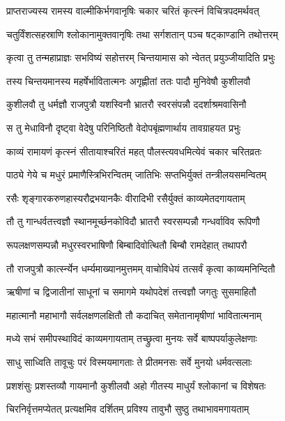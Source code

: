 
\twolineshloka
{प्राप्तराज्यस्य रामस्य वाल्मीकिर्भगवानृषिः}
{चकार चरितं कृत्स्नं विचित्रपदमर्थवत्} %

\twolineshloka
{चतुर्विंशत्सहस्राणि श्लोकानामुक्तवानृषिः}
{तथा सर्गशतान् पञ्च षट्काण्डानि तथोत्तरम्} %

\twolineshloka
{कृत्वा तु तन्महाप्राज्ञः सभविष्यं सहोत्तरम्}
{चिन्तयामास को न्वेतत् प्रयुञ्जीयादिति प्रभुः} %

\twolineshloka
{तस्य चिन्तयमानस्य महर्षेर्भावितात्मनः}
{अगृह्णीतां ततः पादौ मुनिवेषौ कुशीलवौ} %

\twolineshloka
{कुशीलवौ तु धर्मज्ञौ राजपुत्रौ यशस्विनौ}
{भ्रातरौ स्वरसंपन्नौ ददर्शाश्रमवासिनौ} %

\twolineshloka
{स तु मेधाविनौ दृष्ट्वा वेदेषु परिनिष्ठितौ}
{वेदोपबृंह्मणार्थाय तावग्राहयत प्रभुः} %

\twolineshloka
{काव्यं रामायणं कृत्स्नं सीतायाश्चरितं महत्}
{पौलस्त्यवधमित्येवं चकार चरितव्रतः} %

\twolineshloka
{पाठ्ये गेये च मधुरं प्रमाणैस्त्रिभिरन्वितम्}
{जातिभिः सप्तभिर्युक्तं तन्त्रीलयसमन्वितम्} %

\twolineshloka
{रसैः शृङ्गारकरुणहास्यरौद्रभयानकैः}
{वीरादिभी रसैर्युक्तं काव्यमेतदगायताम्} %

\twolineshloka
{तौ तु गान्धर्वतत्त्वज्ञौ स्थानमूर्च्छनकोविदौ}
{भ्रातरौ स्वरसम्पन्नौ गन्धर्वाविव रूपिणौ} %

\twolineshloka
{रूपलक्षणसम्पन्नौ मधुरस्वरभाषिणौ}
{बिम्बादिवोत्थितौ बिम्बौ रामदेहात् तथापरौ} %

\twolineshloka
{तौ राजपुत्रौ कार्त्स्न्येन धर्म्यमाख्यानमुत्तमम्}
{वाचोविधेयं तत्सर्वं कृत्वा काव्यमनिन्दितौ} %

\twolineshloka
{ऋषीणां च द्विजातीनां साधूनां च समागमे}
{यथोपदेशं तत्त्वज्ञौ जगतुः सुसमाहितौ} %

\twolineshloka
{महात्मानौ महाभागौ सर्वलक्षणलक्षितौ}
{तौ कदाचित् समेतानामृषीणां भावितात्मनाम्} %

\twolineshloka
{मध्ये सभं समीपस्थाविदं काव्यमगायताम्}
{तच्छ्रुत्वा मुनयः सर्वे बाष्पपर्याकुलेक्षणाः} %

\twolineshloka
{साधु साध्विति तावूचुः परं विस्मयमागताः}
{ते प्रीतमनसः सर्वे मुनयो धर्मवत्सलाः} %

\twolineshloka
{प्रशशंसुः प्रशस्तव्यौ गायमानौ कुशीलवौ}
{अहो गीतस्य माधुर्यं श्लोकानां च विशेषतः} %

\twolineshloka
{चिरनिर्वृत्तमप्येतत् प्रत्यक्षमिव दर्शितम्}
{प्रविश्य तावुभौ सुष्ठु तथाभावमगायताम्} %

